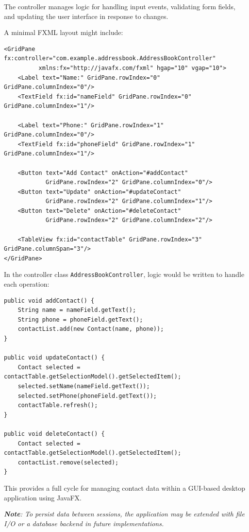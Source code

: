\documentclass{article}
\newcommand{\codecmd}[1]{\textcolor[rgb]{0,0.5,0}{\texttt{#1}}}
\begin{document}
The controller manages logic for handling input events, validating form fields, and updating the user interface in response to changes.

A minimal FXML layout might include:

\begin{verbatim}
<GridPane fx:controller="com.example.addressbook.AddressBookController"
          xmlns:fx="http://javafx.com/fxml" hgap="10" vgap="10">
    <Label text="Name:" GridPane.rowIndex="0" GridPane.columnIndex="0"/>
    <TextField fx:id="nameField" GridPane.rowIndex="0" GridPane.columnIndex="1"/>

    <Label text="Phone:" GridPane.rowIndex="1" GridPane.columnIndex="0"/>
    <TextField fx:id="phoneField" GridPane.rowIndex="1" GridPane.columnIndex="1"/>

    <Button text="Add Contact" onAction="#addContact"
            GridPane.rowIndex="2" GridPane.columnIndex="0"/>
    <Button text="Update" onAction="#updateContact"
            GridPane.rowIndex="2" GridPane.columnIndex="1"/>
    <Button text="Delete" onAction="#deleteContact"
            GridPane.rowIndex="2" GridPane.columnIndex="2"/>

    <TableView fx:id="contactTable" GridPane.rowIndex="3" GridPane.columnSpan="3"/>
</GridPane>
\end{verbatim}

In the controller class \codecmd{AddressBookController}, logic would be written to handle each operation:

\begin{verbatim}
public void addContact() {
    String name = nameField.getText();
    String phone = phoneField.getText();
    contactList.add(new Contact(name, phone));
}

public void updateContact() {
    Contact selected = contactTable.getSelectionModel().getSelectedItem();
    selected.setName(nameField.getText());
    selected.setPhone(phoneField.getText());
    contactTable.refresh();
}

public void deleteContact() {
    Contact selected = contactTable.getSelectionModel().getSelectedItem();
    contactList.remove(selected);
}
\end{verbatim}

\noindent This provides a full cycle for managing contact data within a GUI-based desktop application using JavaFX.

\medskip
\textit{\textbf{Note}: To persist data between sessions, the application may be extended with file I/O or a database backend in future implementations.}
\end{document}
